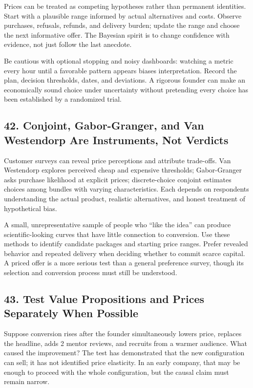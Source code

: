 Prices can be treated as competing hypotheses rather than permanent identities. Start with a plausible range informed by actual alternatives and costs. Observe purchases, refusals, refunds, and delivery burden; update the range and choose the next informative offer. The Bayesian spirit is to change confidence with evidence, not just follow the last anecdote.

Be cautious with optional stopping and noisy dashboards: watching a metric every hour until a favorable pattern appears biases interpretation. Record the plan, decision thresholds, dates, and deviations. A rigorous founder can make an economically sound choice under uncertainty without pretending every choice has been established by a randomized trial.

\subsection*{42. Conjoint, Gabor-Granger, and Van Westendorp Are Instruments, Not Verdicts}

Customer surveys can reveal price perceptions and attribute trade-offs. Van Westendorp explores perceived cheap and expensive thresholds; Gabor-Granger asks purchase likelihood at explicit prices; discrete-choice conjoint estimates choices among bundles with varying characteristics. Each depends on respondents understanding the actual product, realistic alternatives, and honest treatment of hypothetical bias.

A small, unrepresentative sample of people who ``like the idea'' can produce scientific-looking curves that have little connection to conversion. Use these methods to identify candidate packages and starting price ranges. Prefer revealed behavior and repeated delivery when deciding whether to commit scarce capital. A priced offer is a more serious test than a general preference survey, though its selection and conversion process must still be understood.

\subsection*{43. Test Value Propositions and Prices Separately When Possible}

Suppose conversion rises after the founder simultaneously lowers price, replaces the headline, adds 2 mentor reviews, and recruits from a warmer audience. What caused the improvement? The test has demonstrated that the new configuration can sell; it has not identified price elasticity. In an early company, that may be enough to proceed with the whole configuration, but the causal claim must remain narrow.

